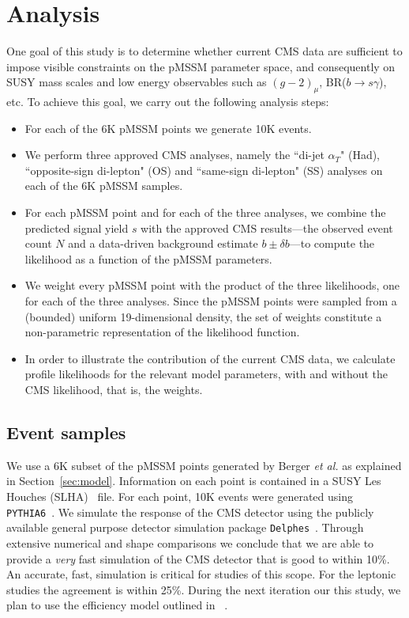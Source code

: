 \section{Analysis}
\label{sec:analysis}

One goal of this study is to determine whether current CMS data are sufficient to impose visible constraints on the pMSSM parameter space, and consequently on SUSY mass scales and low energy observables such as $(g-2)_\mu$, BR($b\rightarrow s\gamma$), etc.  To achieve this goal, we carry out the following analysis steps:
\begin{itemize}
\item For each of the 6K pMSSM points we generate 10K events.
\item We perform three approved CMS analyses, namely the
 ``di-jet $\alpha_T$" (Had), ``opposite-sign di-lepton" (OS) and ``same-sign di-lepton" (SS) 
 analyses on each of the 6K pMSSM samples.
\item For each pMSSM point and for each of the three analyses, we combine the 
predicted signal yield $s$ with the approved CMS results---the
observed event count $N$ and 
a data-driven background estimate $b \pm \delta b$---to compute the likelihood as a function
of the pMSSM parameters. 
\item We weight every pMSSM point with the product of the three likelihoods, one  for each
of the three analyses. Since the pMSSM points were sampled from a (bounded) 
uniform  19-dimensional density, the set of weights constitute a non-parametric 
representation of the likelihood function. 
\item In order to illustrate the contribution of the current CMS data, we calculate profile likelihoods 
for the relevant model parameters, with and without the CMS likelihood, that is, the weights.  \end{itemize}

\subsection{Event samples}

We use a 6K subset of the pMSSM points generated by Berger \emph{et al.} 
as explained in Section~\ref{sec:model}.  Information on each point is contained in a SUSY Les Houches (SLHA)~\cite{Skands:2003cj} file.  For each point, 10K events were generated using {\tt PYTHIA6}~\cite{Sjostrand:2006za}.  We simulate the response of the CMS detector using
the publicly available general purpose detector simulation package {\tt Delphes}~\cite{Ovyn:2009tx}.  Through extensive numerical and shape comparisons we
conclude that we are able to provide a \emph{very} fast simulation of the CMS detector 
that is good to within 10\%. An accurate,  fast, simulation is critical for studies
of this scope. For the leptonic studies the agreement is within 25\%. 
During the next iteration our this study, we plan to 
use the efficiency model outlined in ~\cite{sspaper}.

